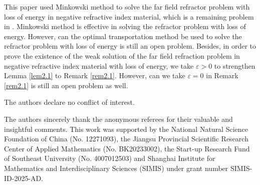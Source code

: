 \documentclass[a4paper,12pt,]{article}
\numberwithin{equation}{section}
\numberwithin{equation}{section} \allowdisplaybreaks
\begin{document}
This paper used Minkowski method to solve the far field refractor problem with loss of energy in negative refractive index material, which is a remaining problem in \cite{St17}. Minkowski method is effective in solving the refractor problem with loss of energy. However, can the optimal transportation method be used to solve the refractor problem with loss of energy is still an open problem. Besides, in order to prove the existence of the weak solution of the far field refraction problem in negative refractive index material with loss of energy, we take $\varepsilon>0$ to strengthen Lemma \ref{lem2.1} to Remark \ref{rem2.1}. However, can we take $\varepsilon = 0$ in Remark \ref{rem2.1} is still an open problem as well.

 



\vspace{3mm}

  { The authors declare no conflict of interest.}

\vspace{3mm}

  { The authors sincerely thank the anonymous referees for their valuable and insightful comments.
This work was supported by the National Natural Science Foundation of China (No. 12271093), the Jiangsu Provincial Scientific Research Center of Applied Mathematics (No. BK20233002), the Start-up Research Fund of Southeast University (No. 4007012503) and Shanghai Institute for Mathematics and Interdisciplinary Sciences (SIMIS) under grant number SIMIS-ID-2025-AD.}
\end{document}
